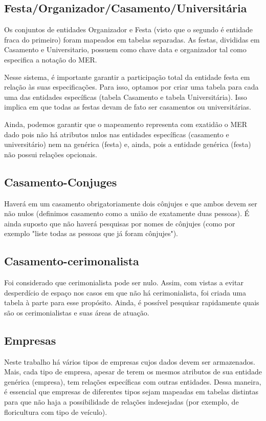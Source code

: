 \documentclass[12pt,a4paper]{article}
\begin{document}
\subsection{Festa/Organizador/Casamento/Universitária}
Os conjuntos de entidades Organizador e Festa (visto que o segundo é entidade fraca do primeiro) foram mapeados em tabelas separadas. As festas, divididas em Casamento e Universitario, possuem como chave data e organizador tal como especifica a notação do MER.

Nesse sistema, é importante garantir a participação total da entidade festa em relação às suas especificações. Para isso, optamos por criar uma tabela para cada uma das entidades específicas (tabela Casamento e tabela Universitária). Isso implica em que todas as festas devam de fato ser casamentos ou universitárias.

Ainda, podemos garantir que o mapeamento representa com exatidão o MER dado pois não há atributos nulos nas entidades específicas (casamento e universitário) nem na genérica (festa) e, ainda, pois a entidade genérica (festa) não possui relações opcionais.


\subsection{Casamento-Conjuges}
Haverá em um casamento obrigatoriamente dois cônjujes e que ambos devem ser não nulos (definimos casamento como a união de exatamente duas pessoas). É ainda suposto que não haverá pesquisas por nomes de cônjujes (como por exemplo "liste todas as pessoas que já foram cônjujes").


\subsection{Casamento-cerimonalista}
Foi considerado que cerimonialista pode ser nulo. Assim, com vistas a evitar desperdício de espaço nos casos em que não há cerimonialista, foi criada uma tabela à parte para esse propósito. Ainda, é possível pesquisar rapidamente quais são os cerimonialistas e suas áreas de atuação.


\subsection{Empresas}
Neste trabalho há vários tipos de empresas cujos dados devem ser armazenados. Mais, cada tipo de empresa, apesar de terem os mesmos atributos de sua entidade genérica (empresa), tem relações específicas com outras entidades. Dessa maneira, é essencial que empresas de diferentes tipos sejam mapeadas em tabelas distintas para que não haja a possibilidade de relações indesejadas (por exemplo, de floricultura com tipo de veículo).
\end{document}
